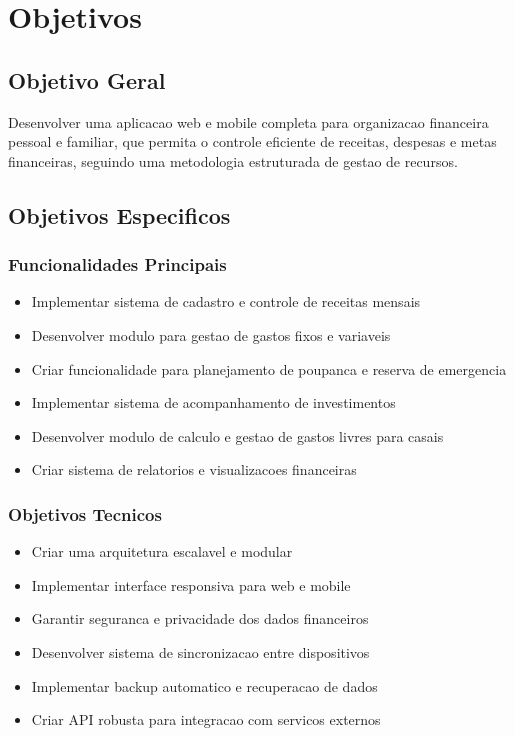 \section{Objetivos}

\subsection{Objetivo Geral}

Desenvolver uma aplicacao web e mobile completa para organizacao financeira pessoal e familiar, que permita o controle eficiente de receitas, despesas e metas financeiras, seguindo uma metodologia estruturada de gestao de recursos.

\subsection{Objetivos Especificos}

\subsubsection{Funcionalidades Principais}
\begin{itemize}
    \item Implementar sistema de cadastro e controle de receitas mensais
    \item Desenvolver modulo para gestao de gastos fixos e variaveis
    \item Criar funcionalidade para planejamento de poupanca e reserva de emergencia
    \item Implementar sistema de acompanhamento de investimentos
    \item Desenvolver modulo de calculo e gestao de gastos livres para casais
    \item Criar sistema de relatorios e visualizacoes financeiras
\end{itemize}

\subsubsection{Objetivos Tecnicos}
\begin{itemize}
    \item Criar uma arquitetura escalavel e modular
    \item Implementar interface responsiva para web e mobile
    \item Garantir seguranca e privacidade dos dados financeiros
    \item Desenvolver sistema de sincronizacao entre dispositivos
    \item Implementar backup automatico e recuperacao de dados
    \item Criar API robusta para integracao com servicos externos
\end{itemize}

